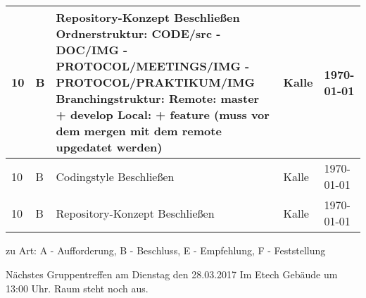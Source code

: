\documentclass[
   draft=false
  ,paper=a4
  ,twoside=false
  ,fontsize=11pt
  ,headsepline
  ,DIV11
  ,parskip=full+
]{scrartcl} %
\begin{document}
\subsection*{\titel}
\vspace{-1em}
\begin{longtable}{
	|p{0.04\txtw} %
	|p{0.04\txtw} %
	|p{0.62\txtw} %
	|p{0.15\txtw} %
	|p{0.15\txtw} %
|}
	\tablehead

 
	10 & B  & Repository-Konzept Beschließen \newline
	Ordnerstruktur: CODE/src - DOC/IMG - PROTOCOL/MEETINGS/IMG - PROTOCOL/PRAKTIKUM/IMG \newline
		  Branchingstruktur: Remote: master + develop \newline Local: + feature (muss vor dem mergen mit dem remote upgedatet werden)
	          & Kalle & \today \\ \hline
10 & B  & Codingstyle Beschließen \newline
	          & Kalle & \today \\ \hline
10 & B  & Repository-Konzept Beschließen \newline
	          & Kalle & \today \\ \hline


\end{longtable}

\vspace{-2.5em}
\footnotesize
zu Art: A - Aufforderung, B - Beschluss, E - Empfehlung, F - Feststellung \\
\normalsize

Nächstes Gruppentreffen am Dienstag den 28.03.2017 Im Etech Gebäude 
um 13:00 Uhr. Raum steht noch aus.


\flushleft
\end{document}
